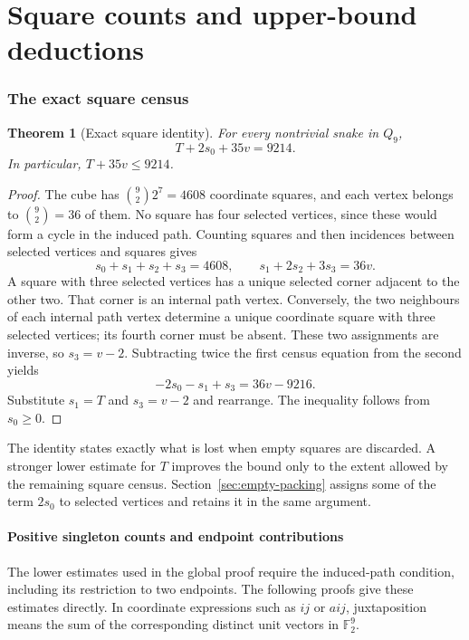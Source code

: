 \documentclass[11pt,a4paper]{article}
\newtheorem{theorem}{Theorem}[section]
\theoremstyle{definition}
\theoremstyle{remark}
\newcommand{\Q}{Q}
\begin{document}
\clearpage
\part{Square counts and upper-bound deductions}
\section{The exact square census}\label{sec:incidence}
\begin{theorem}[Exact square identity]\label{thm:exact-square}
For every nontrivial snake in $\Q_9$,
\begin{equation}\label{eq:exact-square}
T+2s_0+35v=9214.
\end{equation}
In particular, $T+35v\le9214$.
\end{theorem}
\begin{proof}
The cube has $\binom92 2^7=4608$ coordinate squares, and each vertex belongs to $\binom92=36$ of them. No square has four selected vertices, since these would form a cycle in the induced path. Counting squares and then incidences between selected vertices and squares gives
\[
s_0+s_1+s_2+s_3=4608,\qquad s_1+2s_2+3s_3=36v.
\]
A square with three selected vertices has a unique selected corner adjacent to the other two. That corner is an internal path vertex. Conversely, the two neighbours of each internal path vertex determine a unique coordinate square with three selected vertices; its fourth corner must be absent. These two assignments are inverse, so $s_3=v-2$. Subtracting twice the first census equation from the second yields
\[
-2s_0-s_1+s_3=36v-9216.
\]
Substitute $s_1=T$ and $s_3=v-2$ and rearrange. The inequality follows from $s_0\ge0$.
\end{proof}

The identity states exactly what is lost when empty squares are discarded. A stronger lower estimate for $T$ improves the bound only to the extent allowed by the remaining square census. Section~\ref{sec:empty-packing} assigns some of the term $2s_0$ to selected vertices and retains it in the same argument.

\subsection{Positive singleton counts and endpoint contributions}
The lower estimates used in the global proof require the induced-path condition, including its restriction to two endpoints. The following proofs give these estimates directly. In coordinate expressions such as $ij$ or $aij$, juxtaposition means the sum of the corresponding distinct unit vectors in $\mathbb F_2^9$.
\end{document}
